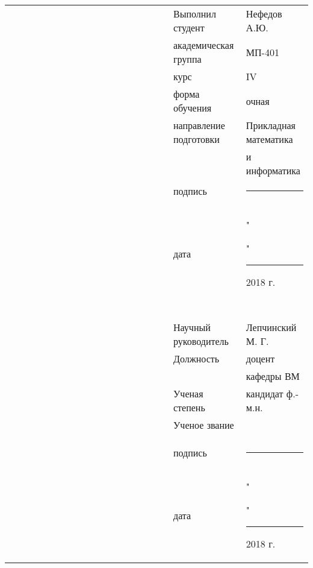 \documentclass[12pt,a4paper,titlepage]{article}
\theoremstyle{definition}
\begin{document}
\begin{titlepage}
\begin{center}
{\footnotesize
\begin{tabular}[t]{lllllllllllllllllll}
& & & & & & & & & & & & & & & & &   Выполнил студент       &   Нефедов А.Ю.   \\
& & & & & & & & & & & & & & & & &   академическая группа   &   МП-401        \\
& & & & & & & & & & & & & & & & &   курс                   &   IV            \\
& & & & & & & & & & & & & & & & &   форма обучения         &   очная         \\
& & & & & & & & & & & & & & & & &   направление подготовки &   Прикладная математика    \\
& & & & & & & & & & & & & & & & &                          &    и информатика              \\
& & & & & & & & & & & & & & & & &   подпись                &   \rule{3.3cm}{0.01cm}\\
& & & & & & & & & & & & & & & & &                          &                 \\
& & & & & & & & & & & & & & & & &   дата                   &   "\rule{0,7cm}{0.01cm}"\rule{1cm}{0.01cm} 2018 г.\\
& & & & & & & & & & & & & & & & &                          &                 \\
& & & & & & & & & & & & & & & & &                          &                 \\
& & & & & & & & & & & & & & & & &                          &                 \\
& & & & & & & & & & & & & & & & &                          &                 \\
& & & & & & & & & & & & & & & & &                          &                 \\
& & & & & & & & & & & & & & & & &   Научный руководитель   &   Лепчинский М. Г.\\
& & & & & & & & & & & & & & & & &   Должность              &   доцент     \\
& & & & & & & & & & & & & & & & &                          &   кафедры ВМ  \\
& & & & & & & & & & & & & & & & &   Ученая степень         &   кандидат ф.-м.н.\\
& & & & & & & & & & & & & & & & &   Ученое звание          &                 \\
& & & & & & & & & & & & & & & & &                          &                 \\
& & & & & & & & & & & & & & & & &                          &                 \\
& & & & & & & & & & & & & & & & &   подпись                &  \rule{3.3cm}{0.01cm}\\
& & & & & & & & & & & & & & & & &                          &                 \\
& & & & & & & & & & & & & & & & &   дата                   &  "\rule{0,7cm}{0.01cm}"\rule{1cm}{0.01cm} 2018 г.     \\


\end{tabular}}
\end{center}
\end{titlepage}
\end{document}
